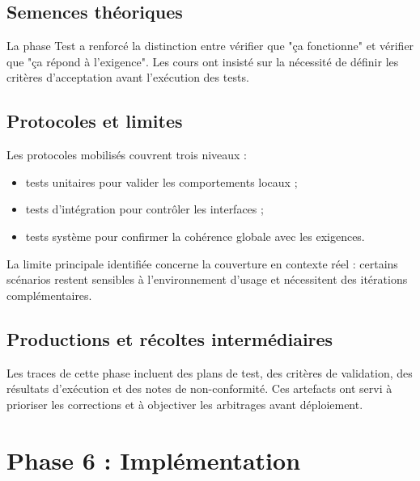 
\subsection{Semences théoriques}

La phase Test a renforcé la distinction entre vérifier que "\c ca fonctionne" et vérifier que "\c ca répond à l'exigence". Les cours ont insisté sur la nécessité de définir les critères d'acceptation avant l'exécution des tests.

\subsection{Protocoles et limites}

Les protocoles mobilisés couvrent trois niveaux :
\begin{itemize}
  \item tests unitaires pour valider les comportements locaux ;
  \item tests d'intégration pour contrôler les interfaces ;
  \item tests système pour confirmer la cohérence globale avec les exigences.
\end{itemize}

La limite principale identifiée concerne la couverture en contexte réel : certains scénarios restent sensibles à l'environnement d'usage et nécessitent des itérations complémentaires.

\subsection{Productions et récoltes intermédiaires}

Les traces de cette phase incluent des plans de test, des critères de validation, des résultats d'exécution et des notes de non-conformité. Ces artefacts ont servi à prioriser les corrections et à objectiver les arbitrages avant déploiement.

\section{Phase 6 : Implémentation}


